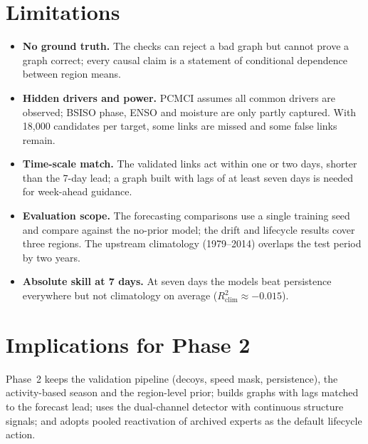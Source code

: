 \section{Limitations}
\label{sec:res-validity}

\begin{itemize}
  \item \textbf{No ground truth.} The checks can reject a bad graph but cannot prove a graph correct; every causal claim is a statement of conditional dependence between region means.
  \item \textbf{Hidden drivers and power.} PCMCI assumes all common drivers are observed; BSISO phase, ENSO and moisture are only partly captured. With 18{,}000 candidates per target, some links are missed and some false links remain.
  \item \textbf{Time-scale match.} The validated links act within one or two days, shorter than the 7-day lead; a graph built with lags of at least seven days is needed for week-ahead guidance.
  \item \textbf{Evaluation scope.} The forecasting comparisons use a single training seed and compare against the no-prior model; the drift and lifecycle results cover three regions. The upstream climatology (1979--2014) overlaps the test period by two years.
  \item \textbf{Absolute skill at 7 days.} At seven days the models beat persistence everywhere but not climatology on average ($R^2_{\mathrm{clim}}\approx-0.015$).
\end{itemize}

\section{Implications for Phase 2}
\label{sec:res-implications}

Phase~2 keeps the validation pipeline (decoys, speed mask, persistence), the activity-based season and the region-level prior; builds graphs with lags matched to the forecast lead; uses the dual-channel detector with continuous structure signals; and adopts pooled reactivation of archived experts as the default lifecycle action.

